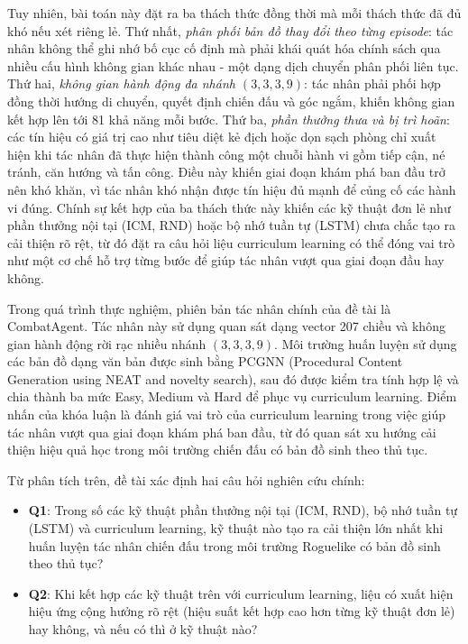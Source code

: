 Tuy nhiên, bài toán này đặt ra ba thách thức đồng thời mà mỗi thách thức đã đủ khó nếu xét riêng lẻ. Thứ nhất, \textit{phân phối bản đồ thay đổi theo từng episode}: tác nhân không thể ghi nhớ bố cục cố định mà phải khái quát hóa chính sách qua nhiều cấu hình không gian khác nhau - một dạng dịch chuyển phân phối liên tục. Thứ hai, \textit{không gian hành động đa nhánh $(3,3,3,9)$}: tác nhân phải phối hợp đồng thời hướng di chuyển, quyết định chiến đấu và góc ngắm, khiến không gian kết hợp lên tới 81 khả năng mỗi bước. Thứ ba, \textit{phần thưởng thưa và bị trì hoãn}: các tín hiệu có giá trị cao như tiêu diệt kẻ địch hoặc dọn sạch phòng chỉ xuất hiện khi tác nhân đã thực hiện thành công một chuỗi hành vi gồm tiếp cận, né tránh, căn hướng và tấn công. Điều này khiến giai đoạn khám phá ban đầu trở nên khó khăn, vì tác nhân khó nhận được tín hiệu đủ mạnh để củng cố các hành vi đúng. Chính sự kết hợp của ba thách thức này khiến các kỹ thuật đơn lẻ như phần thưởng nội tại (ICM, RND) hoặc bộ nhớ tuần tự (LSTM) chưa chắc tạo ra cải thiện rõ rệt, từ đó đặt ra câu hỏi liệu curriculum learning có thể đóng vai trò như một cơ chế hỗ trợ từng bước để giúp tác nhân vượt qua giai đoạn đầu hay không.

Trong quá trình thực nghiệm, phiên bản tác nhân chính của đề tài là CombatAgent. Tác nhân này sử dụng quan sát dạng vector 207 chiều và không gian hành động rời rạc nhiều nhánh $(3,3,3,9)$. Môi trường huấn luyện sử dụng các bản đồ dạng văn bản được sinh bằng PCGNN (Procedural Content Generation using NEAT and novelty search), sau đó được kiểm tra tính hợp lệ và chia thành ba mức Easy, Medium và Hard để phục vụ curriculum learning. Điểm nhấn của khóa luận là đánh giá vai trò của curriculum learning trong việc giúp tác nhân vượt qua giai đoạn khám phá ban đầu, từ đó quan sát xu hướng cải thiện hiệu quả học trong môi trường chiến đấu có bản đồ sinh theo thủ tục.

\vspace{0.5cm}

Từ phân tích trên, đề tài xác định hai câu hỏi nghiên cứu chính:

\renewcommand{\labelitemi}{$-$}
\begin{itemize}
    \item \textbf{Q1}: Trong số các kỹ thuật phần thưởng nội tại (ICM, RND), bộ nhớ tuần tự (LSTM) và curriculum learning, kỹ thuật nào tạo ra cải thiện lớn nhất khi huấn luyện tác nhân chiến đấu trong môi trường Roguelike có bản đồ sinh theo thủ tục?
    \item \textbf{Q2}: Khi kết hợp các kỹ thuật trên với curriculum learning, liệu có xuất hiện hiệu ứng cộng hưởng rõ rệt (hiệu suất kết hợp cao hơn từng kỹ thuật đơn lẻ) hay không, và nếu có thì ở kỹ thuật nào?
\end{itemize}

